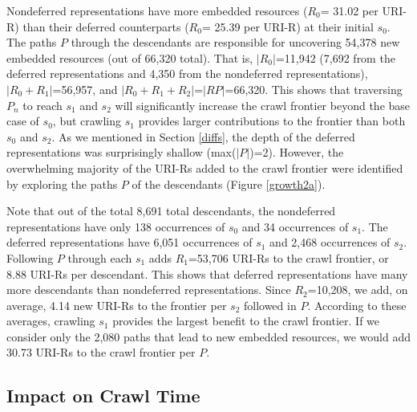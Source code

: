 \documentclass{sig-alternate}
\begin{document}
Nondeferred representations have more embedded resources ($R_0$= 31.02 per URI-R) than their deferred counterparts ($R_0$= 25.39 per URI-R) at their initial $s_0$. The paths $P$ through the descendants are responsible for uncovering 54,378 new embedded resources (out of 66,320 total). That is, $|R_0|$=11,942 (7,692 from the deferred representations and 4,350 from the nondeferred representations), $|R_0 + R_1|$=56,957, and $|R_0 + R_1 + R_2|$=$|RP|$=66,320. This shows that traversing $P_n$ to reach $s_1$ and $s_2$ will significantly increase the crawl frontier beyond the base case of $s_0$, but crawling $s_1$ provides larger contributions to the frontier than both $s_0$ and $s_2$. 
As we mentioned in Section \ref{diffs}, the depth of the deferred representations was surprisingly shallow (max($|P|$)=2). However, the overwhelming majority of the URI-Rs added to the crawl frontier were identified by exploring the paths $P$ of the descendants (Figure \ref{growth2a}). %


Note that out of the total 8,691 total descendants, the nondeferred representations have only 138 occurrences of $s_0$ and 34 occurrences of $s_1$. The deferred representations have 6,051 occurrences of $s_1$ and 2,468 occurrences of $s_2$. Following $P$ through each $s_1$ adds $R_1$=53,706 URI-Rs to the crawl frontier, or 8.88 URI-Rs per descendant. This shows that deferred representations have many more descendants than nondeferred representations. Since $R_2$=10,208, we add, on average, 4.14 new URI-Rs to the frontier per $s_2$ followed in $P$. According to these averages, crawling $s_1$ provides the largest benefit to the crawl frontier. If we consider only the 2,080 paths that lead to new embedded resources, we would add 30.73 URI-Rs to the crawl frontier per $P$.


\subsection{Impact on Crawl Time}
\label{value}
\end{document}
